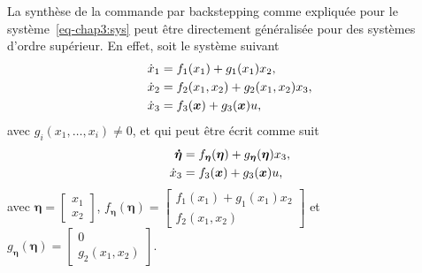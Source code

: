 La synthèse de la commande par backstepping comme expliquée pour le système~\eqref{eq-chap3:sys}  peut être directement généralisée pour des systèmes d'ordre supérieur. En effet,
soit le système suivant 
\begin{subequations}%
	\begin{align*}
			\dot{x}_1 &= f_1(x_1) + g_1(x_1)x_2,\\
			\dot{x}_2 &= f_2(x_1,x_2) + g_2(x_1,x_2)x_3,\\
			\dot{x}_3 &= f_3(\bm{x}) + g_3(\bm{x})u,
	\end{align*}
\end{subequations}
avec $g_i(x_1,\ldots,x_i)\neq0$, et	qui peut être écrit comme suit 
	\begin{subequations}\label{eq-chap3:sys 3rd order}
		\begin{align}
			\label{eq-chap3:subsys1_3rd}	\boldsymbol{\dot{\eta}} &= f_{\boldsymbol{{\eta}}}(\boldsymbol{\eta}) + g_{\boldsymbol{\eta}}(\boldsymbol{\eta})x_3,\\
			\label{eq-chap3:subsys2_3rd}	\dot{x}_3 &= f_3(\bm{x}) + g_3(\bm{x})u,
		\end{align}
\end{subequations}
avec $ \boldsymbol{\eta} = \begin{bmatrix}
	x_1 \\ x_2
\end{bmatrix}$, $f_{\boldsymbol{{\eta}}}(\boldsymbol{\eta}) = \begin{bmatrix}
f_1(x_1) + g_1(x_1)x_2 \\f_2(x_1,x_2)
\end{bmatrix}$ et $g_{\boldsymbol{{\eta}}}(\boldsymbol{\eta}) = \begin{bmatrix}
0 \\g_2(x_1,x_2)
\end{bmatrix}$.

